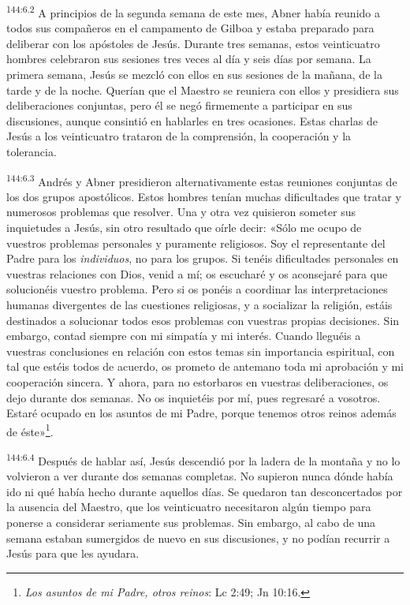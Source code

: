 \par
\textsuperscript{144:6.2} A principios de la segunda semana de este mes, Abner había reunido a todos sus compañeros en el campamento de Gilboa y estaba preparado para deliberar con los apóstoles de Jesús. Durante tres semanas, estos veinticuatro hombres celebraron sus sesiones tres veces al día y seis días por semana. La primera semana, Jesús se mezcló con ellos en sus sesiones de la mañana, de la tarde y de la noche. Querían que el Maestro se reuniera con ellos y presidiera sus deliberaciones conjuntas, pero él se negó firmemente a participar en sus discusiones, aunque consintió en hablarles en tres ocasiones. Estas charlas de Jesús a los veinticuatro trataron de la comprensión, la cooperación y la tolerancia.

\par
\textsuperscript{144:6.3} Andrés y Abner presidieron alternativamente estas reuniones conjuntas de los dos grupos apostólicos. Estos hombres tenían muchas dificultades que tratar y numerosos problemas que resolver. Una y otra vez quisieron someter sus inquietudes a Jesús, sin otro resultado que oírle decir: «Sólo me ocupo de vuestros problemas personales y puramente religiosos. Soy el representante del Padre para los \textit{individuos}, no para los grupos. Si tenéis dificultades personales en vuestras relaciones con Dios, venid a mí; os escucharé y os aconsejaré para que solucionéis vuestro problema. Pero si os ponéis a coordinar las interpretaciones humanas divergentes de las cuestiones religiosas, y a socializar la religión, estáis destinados a solucionar todos esos problemas con vuestras propias decisiones. Sin embargo, contad siempre con mi simpatía y mi interés. Cuando lleguéis a vuestras conclusiones en relación con estos temas sin importancia espiritual, con tal que estéis todos de acuerdo, os prometo de antemano toda mi aprobación y mi cooperación sincera. Y ahora, para no estorbaros en vuestras deliberaciones, os dejo durante dos semanas. No os inquietéis por mí, pues regresaré a vosotros. Estaré ocupado en los asuntos de mi Padre, porque tenemos otros reinos además de éste»\footnote{\textit{Los asuntos de mi Padre, otros reinos}: Lc 2:49; Jn 10:16.}.

\par
\textsuperscript{144:6.4} Después de hablar así, Jesús descendió por la ladera de la montaña y no lo volvieron a ver durante dos semanas completas. No supieron nunca dónde había ido ni qué había hecho durante aquellos días. Se quedaron tan desconcertados por la ausencia del Maestro, que los veinticuatro necesitaron algún tiempo para ponerse a considerar seriamente sus problemas. Sin embargo, al cabo de una semana estaban sumergidos de nuevo en sus discusiones, y no podían recurrir a Jesús para que les ayudara.

